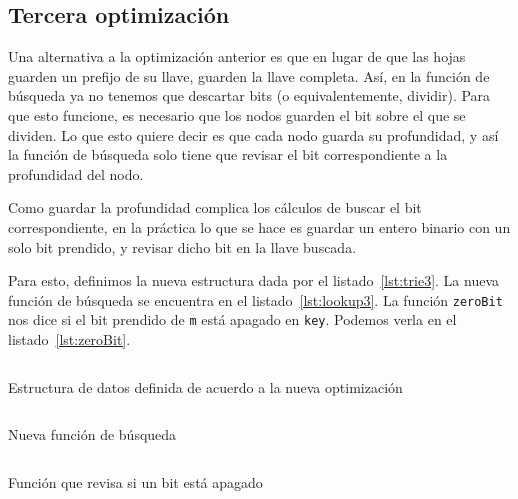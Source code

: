 \documentclass[11pt,letterpaper]{article}
\begin{document}
\subsection{Tercera optimización}

\noindent Una alternativa a la optimización anterior es que en lugar de que las hojas guarden un prefijo de su llave, guarden la llave completa. Así, en la función de búsqueda ya no tenemos que descartar bits (o equivalentemente, dividir). Para que esto funcione, es necesario que los nodos guarden el bit sobre el que se dividen. Lo que esto quiere decir es que cada nodo guarda su profundidad, y así la función de búsqueda solo tiene que revisar el bit correspondiente a la profundidad del nodo.

Como guardar la profundidad complica los cálculos de buscar el bit correspondiente, en la práctica lo que se hace es guardar un entero binario con un solo bit prendido, y revisar dicho bit en la llave buscada.

Para esto, definimos la nueva estructura dada por el listado~\ref{lst:trie3}. La nueva función de búsqueda se encuentra en el listado~\ref{lst:lookup3}. La función \texttt{zeroBit} nos dice si el bit prendido de \texttt{m} está apagado en \texttt{key}. Podemos verla en el listado~\ref{lst:zeroBit}.

\begin{listing}[H]
  \inputminted{coq}{src/trie3.v}
  \caption{Estructura de datos definida de acuerdo a la nueva optimización}
  \label{lst:trie3}
\end{listing}

\begin{listing}[H]
  \inputminted{coq}{src/lookup3.v}
  \caption{Nueva función de búsqueda}
  \label{lst:lookup3}
\end{listing}

\begin{listing}[H]
  \inputminted{coq}{src/zeroBit.v}
  \caption{Función que revisa si un bit está apagado}
  \label{lst:zeroBit}
\end{listing}

\nocite{*}
 
 
\end{document}

